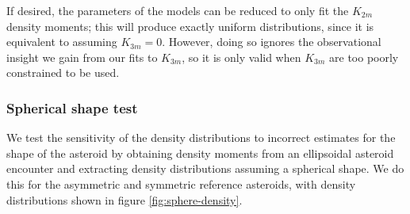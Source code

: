 \documentclass[fleqn,usenatbib]{mnras}
\begin{document}
If desired, the parameters of the models can be reduced to only fit the $K_{2m}$ density moments; this will produce exactly uniform distributions, since it is equivalent to assuming $K_{3m}=0$. However, doing so ignores the observational insight we gain from our fits to $K_{3m}$, so it is only valid when $K_{3m}$ are too poorly constrained to be used. 

\subsubsection{Spherical shape test}
We test the sensitivity of the density distributions to incorrect estimates for the shape of the asteroid by obtaining density moments from an ellipsoidal asteroid encounter and extracting density distributions assuming a spherical shape. We do this for the asymmetric and symmetric reference asteroids, with density distributions shown in figure \ref{fig:sphere-density}.
\end{document}
